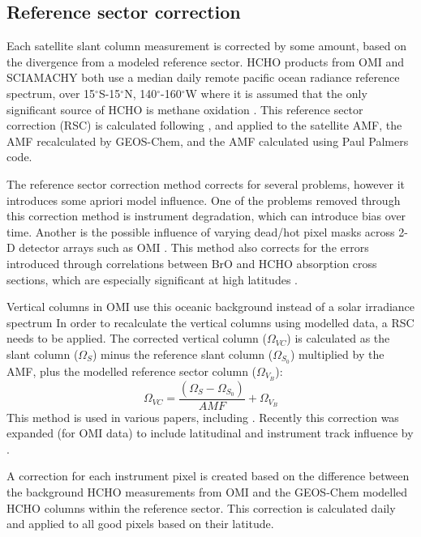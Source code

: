   \subsection{Reference sector correction}
    \label{Model:omiRecalc:RSC}
    Each satellite slant column measurement is corrected by some amount, based on the divergence from a modeled reference sector.
    HCHO products from OMI and SCIAMACHY both use a median daily remote pacific ocean radiance reference spectrum, over 15$^{\circ}$S-15$^{\circ}$N, 140$^{\circ}$-160$^{\circ}$W where it is assumed that the only significant source of HCHO is methane oxidation \parencite{DeSmedt2008,Barkley2013,Kurosu2014}.
    This reference sector correction (RSC) is calculated following \textcite{Abad2016}, and applied to the satellite AMF, the AMF recalculated by GEOS-Chem, and the AMF calculated using Paul Palmers code.
    
    The reference sector correction method corrects for several problems, however it introduces some apriori model influence.
    One of the problems removed through this correction method is instrument degradation, which can introduce bias over time.
    Another is the possible influence of varying dead/hot pixel masks across 2-D detector arrays such as OMI \parencite{DeSmedt2015}.
    This method also corrects for the errors introduced through correlations between BrO and HCHO absorption cross sections, which are especially significant at high latitudes \parencite{Abad2015}.
    
    Vertical columns in OMI use this oceanic background instead of a solar irradiance spectrum
    In order to recalculate the vertical columns using modelled data, a RSC needs to be applied.
    The corrected vertical column ($\Omega_{VC}$) is calculated as the slant column ($\Omega_S$) minus the reference slant column ($\Omega_{S_0}$) multiplied by the AMF, plus the modelled reference sector column ($\Omega_{V_B}$):
    \begin{equation*}
      \Omega_{VC} = \frac{ \left( \Omega_S - \Omega_{S_0} \right) }{ AMF } + \Omega_{V_B}
    \end{equation*}
    This method is used in various papers, including \citet{DeSmedt2008, DeSmedt2012, DeSmedt2015, Barkley2013, Bauwens2016}.
    Recently this correction was expanded (for OMI data) to include latitudinal and instrument track influence by \citet{Abad2015}.
    
    A correction for each instrument pixel is created based on the difference between the background HCHO measurements from OMI and the GEOS-Chem modelled HCHO columns within the reference sector.
    This correction is calculated daily and applied to all good pixels based on their latitude.
    
